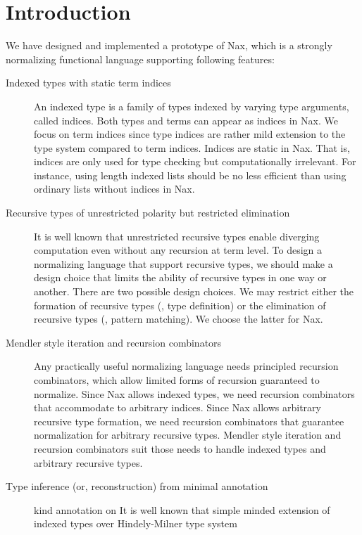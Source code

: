 \section{Introduction}

We have designed and implemented a prototype of Nax, which is
a strongly normalizing functional language supporting following features:
\begin{description}
\item[Indexed types with static term indices]
An indexed type is a family of types indexed by varying type arguments,
called indices. Both types and terms can appear as indices in Nax.
We focus on term indices since type indices are rather mild extension to
the type system compared to term indices.
Indices are static in Nax. That is, indices are only used for type checking
but computationally irrelevant. For instance, using length indexed lists
should be no less efficient than using ordinary lists without indices in Nax.

\item[Recursive types of unrestricted polarity but restricted elimination]
It is well known that unrestricted recursive types enable diverging computation
even without any recursion at term level. To design a normalizing language
that support recursive types, we should make a design choice that limits
the ability of recursive types in one way or another. There are two possible
design choices. We may restrict either the formation of recursive types
(\ie, type definition) or the elimination of recursive types
(\ie, pattern matching). We choose the latter for Nax.

\item[Mendler style iteration and recursion combinators]
Any practically useful normalizing language needs principled recursion
combinators, which allow limited forms of recursion guaranteed to normalize.
Since Nax allows indexed types, we need recursion combinators that accommodate
to arbitrary indices. Since Nax allows arbitrary recursive type formation,
we need recursion combinators that guarantee normalization for arbitrary
recursive types. Mendler style iteration and recursion combinators suit
those needs to handle indexed types and arbitrary recursive types.

\item[Type inference (or, reconstruction) from minimal annotation]
kind annotation on
It is well known that simple minded extension of indexed types over
Hindely-Milner type system 
\end{description}

